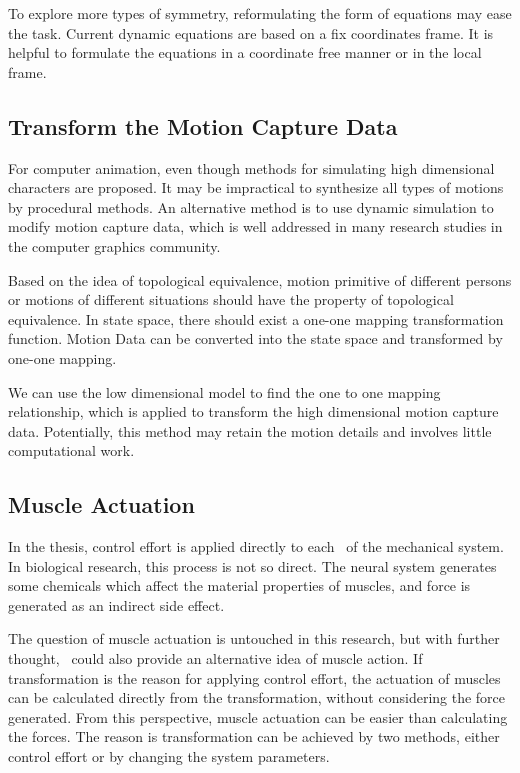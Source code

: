 To explore more types of symmetry, reformulating the form of equations may ease the task.
Current dynamic equations are based on a fix coordinates frame.
It is helpful to formulate the equations in a coordinate free manner or in the local frame.






\subsection{Transform the Motion Capture Data}
For computer animation, even though methods for simulating high dimensional characters are proposed.
It may be impractical to synthesize all types of motions by procedural methods.
An alternative method is to use dynamic simulation to modify motion capture data, which is well addressed in many research studies in the computer  graphics community.



Based on the idea of topological equivalence, 
motion primitive of different persons or motions of different situations should have the property of topological equivalence.
In state space, there should exist a one-one mapping transformation function.
Motion Data can be converted into the state space and  transformed by one-one mapping.


We can use the low dimensional model to find the one to one mapping relationship, 
which is applied to transform the high dimensional motion capture data.
Potentially, this method may retain the motion details and involves little computational work. 





\subsection{Muscle Actuation}
In the thesis, control effort is applied directly to each \dof\ of the mechanical system.
In biological research, this process is not so direct.
The neural system generates some chemicals which affect the material properties of muscles, and force is generated as an indirect side effect.


The question of muscle actuation is untouched in this research,
but with further thought, \moit\ could also provide an alternative idea of muscle action.
If transformation is the reason for applying control effort, the actuation of muscles can be calculated directly from the transformation, without considering the force generated.
From this perspective, muscle actuation can be easier than calculating the forces.
The reason is transformation can be achieved by two methods, either control effort or by changing the system parameters.

